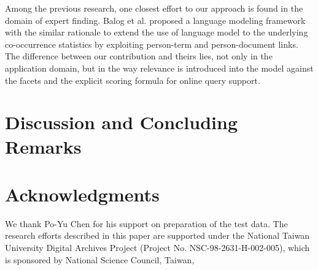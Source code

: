 Among the previous research, one closest effort to our approach is found in the
domain of expert finding.  Balog et al. \cite{balog2009language} proposed a
language modeling framework with the similar rationale to extend the use of
language model to the underlying co-occurrence statistics by exploiting
person-term and person-document links.  The difference between our contribution
and theirs lies, not only in the application domain, but in the way relevance
is introduced into the model against the facets and the explicit scoring
formula for online query support.
 
\section{Discussion and Concluding Remarks}


\section{Acknowledgments}

We thank Po-Yu Chen for his support on preparation of the test data.  The
research efforts described in this paper are supported under the National Taiwan
University Digital Archives Project (Project No.  NSC-98-2631-H-002-005), which
is sponsored by National Science Council, Taiwan, 
